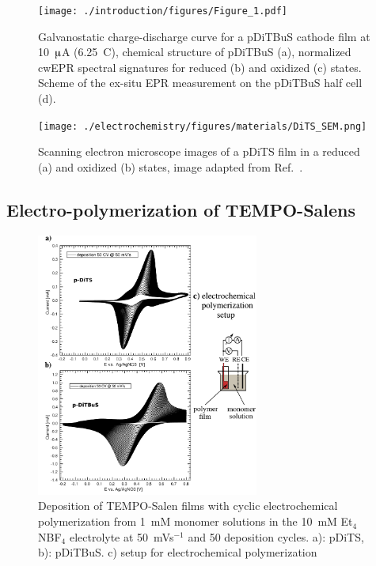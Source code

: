 \begin{figure}[h]
\center
	\texttt{[image: ./introduction/figures/Figure\_1.pdf]}
	\caption{Galvanostatic charge-discharge curve for a pDiTBuS cathode film at 10~$\muup$A (6.25~C), chemical structure of pDiTBuS (a), normalized cwEPR spectral signatures for reduced (b) and oxidized (c) states. Scheme of the ex-situ EPR measurement on the pDiTBuS half cell (d).}
	\label{fig:Figure_1}
\end{figure}



\begin{figure}[!h]
\center
	\texttt{[image: ./electrochemistry/figures/materials/DiTS\_SEM.png]}
	\caption{Scanning electron microscope images of a pDiTS film in a reduced (a) and oxidized (b) states, image adapted from Ref.~\cite{Vereshchagin2020}.}
	\label{fig:Figure_1}
\end{figure}


\subsection{Electro-polymerization of TEMPO-Salens}
\begin{figure}[!h]
\center
	\includegraphics[width=0.65\textwidth]{./electrochemistry/figures/DITBUS_DEPO.pdf}
	\caption{Deposition of TEMPO-Salen films with cyclic electrochemical polymerization from 1~mM monomer solutions in the 10~mM Et$_4$NBF$_4$ electrolyte at 50~mVs$^{-1}$ and 50 deposition cycles. a): pDiTS, b): pDiTBuS. c) setup for electrochemical polymerization}
	\label{fig:DITBUS_DEPO}
\end{figure}

